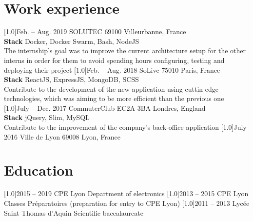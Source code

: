 \documentclass[english]{cv-style}          %
\begin{document}
\section{Work experience}
\begin{entrylist}
\vspace{0.5cm}
\entry
  {\scalebox{.8}[1.0]{Feb. -- Aug. 2019}}
  {SOLUTEC}
  {69100 Villeurbanne, France}
  {\\
  \textbf{Stack} Docker, Docker Swarm, Bash, NodeJS\\
  The internship's goal was to improve the current architecture setup for the other interns in order for them to avoid spending hours configuring, testing and deploying their project}
\vspace{0.5cm}
\entry
  {\scalebox{.8}[1.0]{Feb. -- Aug. 2018}}
  {SoLive}
  {75010 Paris, France}
  {\\
  \textbf{Stack} ReactJS, ExpressJS, MongoDB, SCSS\\
  Contribute to the development of the new application using cuttin-edge technologies, which was aiming to be more efficient than the previous one}
\vspace{0.5cm}
\entry
  {\scalebox{.8}[1.0]{July -- Dec. 2017}}
  {CommuterClub}
  {EC2A 3BA Londres, England}
  {\\
  \textbf{Stack} jQuery, Slim, MySQL\\
  Contribute to the improvement of the company's back-office application}
\entry
  {\scalebox{.8}[1.0]{July 2016}}
  {Ville de Lyon}
  {69008 Lyon, France}
  {}
 
\end{entrylist}

\section{Education}
\begin{entrylist}
\vspace{0.5cm}
\entry
  {\scalebox{.8}[1.0]{2015 -- 2019}}
  {CPE Lyon}
  {}
  {Department of electronics}
\vspace{0.5cm}
\entry
  {\scalebox{.8}[1.0]{2013 -- 2015}}
  {CPE Lyon}
  {}
  {Classes Préparatoires (preparation for entry to CPE Lyon)}
\entry
  {\scalebox{.8}[1.0]{2011 -- 2013}}
  {Lycée Saint Thomas d'Aquin}
  {}
  {Scientific baccalaureate}
 
\end{entrylist}
\end{document}
